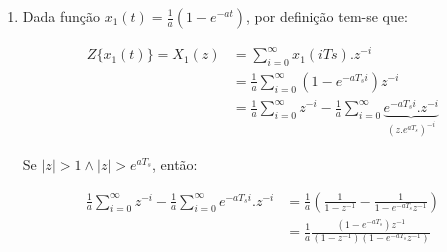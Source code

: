 \documentclass{article}
\begin{document}
\begin{enumerate}
\begin{itemize}
	\begin{equation}
	\therefore Z\{\sum_{i=0}^{n}x[i-1] \} = \frac{z^{-1}}{1-z^{-1}}.X(z) \hspace{10pt} \blacksquare
	\end{equation}

	\item $\lim\limits_{z \rightarrow 1} X(z) = \sum_{i=0}^{\infty}x[i]$

	\begin{equation}
	\lim\limits_{z \rightarrow 1} X(z) & = \lim\limits_{z \rightarrow 1} \sum_{i=0}^{\infty} x[i].z^{-i} = \sum_{i=0}^{\infty} x[i]
	\end{equation}
	
	\begin{equation}
	\begin{split}
	\therefore \lim\limits_{z \rightarrow 1} X(z) = \sum_{i=0}^{\infty}x[i] \hspace{10pt} \blacksquare
	\end{split}
	\end{equation}
	
\end{itemize}

\item\label{item:ex2b} %
Dada função $x_1(t) = \frac{1}{a} \left( 1 - e^{-at} \right)$, por definição tem-se que:

	\begin{equation}
	\begin{split}
	Z\{x_1(t)\} = X_1(z) & = \sum_{i=0}^{\infty} x_1(i Ts).z^{-i} \\
	& = \frac{1}{a} \sum_{i=0}^{\infty} \left( 1 - e^{-a T_s i} \right)z^{-i} \\
	& = \frac{1}{a} \sum_{i=0}^{\infty} z^{-i} - \frac{1}{a} \sum_{i=0}^{\infty} \underbrace{e^{-a T_s i}.z^{-i}}_{(z.e^{aT_s})^{-i}}
	\end{split}
	\end{equation}
	
Se $|z| > 1 \wedge |z| > e^{aT_s}$, então:
	
	\begin{equation}
	\begin{split}
	\frac{1}{a} \sum_{i=0}^{\infty} z^{-i} - \frac{1}{a} \sum_{i=0}^{\infty} e^{-a T_s i}.z^{-i} & = \frac{1}{a} (\frac{1}{1-z^ {-1}} - \frac{1}{1-e^{-aT_s} z^ {-1}}) \\
	& = \frac{1}{a} \frac{(1 - e^{-aT_s})z^{-1}}{(1-z^{-1})(1-e^{-aT_s} z^ {-1})}
	\end{split}
	\end{equation}
	

\end{enumerate}
\end{document}
